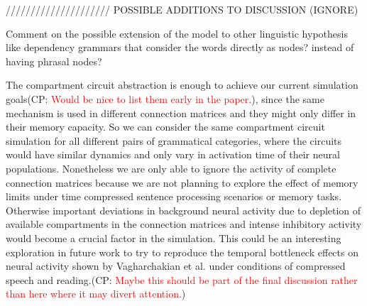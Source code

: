 \documentclass[10pt]{article}
\newcommand{\noteCP}[1]{(CP: \textcolor{red}{#1})}
\begin{document}
///////////////////// POSSIBLE ADDITIONS TO DISCUSSION (IGNORE)


Comment on the possible extension of the model to other linguistic hypothesis like dependency grammars that consider the words directly as nodes? instead of having phrasal nodes?


The compartment circuit abstraction is enough to achieve our current
simulation goals\noteCP{Would be nice to list them early in the paper.},
since the same mechanism is used in different connection matrices and
they might only differ in their memory capacity. So we can consider
the same compartment circuit simulation for all different pairs of
grammatical categories, where the circuits would have similar dynamics
and only vary in activation time of their neural populations.
Nonetheless we are only able to ignore the activity of complete
connection matrices because we are not planning to explore the effect
of memory limits under time compressed sentence processing scenarios
or memory tasks. Otherwise important deviations in background neural
activity due to depletion of available compartments in the connection
matrices and intense inhibitory activity would become a crucial factor
in the simulation. This could be an interesting exploration in future
work to try to reproduce the temporal bottleneck effects on neural
activity shown by Vagharchakian et al. under conditions of compressed
speech and reading\cite{Vagharchakian_2012}.\noteCP{Maybe this should
  be part of the final discussion rather than here where it may divert
  attention.}




\end{document}
